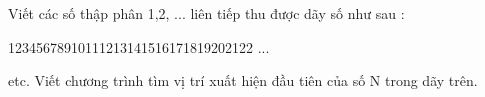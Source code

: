 Viết các số thập phân 1,2, ... liên tiếp thu được dãy số như sau :  

   12345678910111213141516171819202122 ...  

   etc.  Viết chương trình tìm vị trí xuất hiện đầu tiên của số N trong dãy trên.  



\